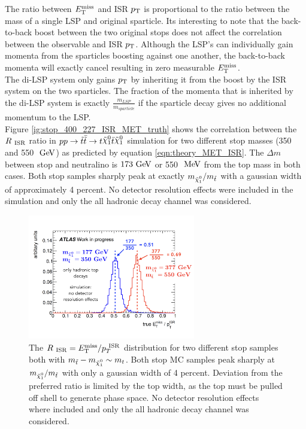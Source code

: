 \indent The ratio between $E_{\mathrm{T}}^{\mathrm{miss}}$ and ISR $p_{\mathrm{T}}$ is proportional to the ratio between the mass of a single LSP and original sparticle.  Its interesting to note that the back-to-back boost between the two original stops does not affect the correlation between the observable \MET and ISR $p_{\mathrm{T}}$.  Although the LSP's can individually gain momenta from the sparticles boosting against one another, the back-to-back momenta will exactly cancel resulting in zero measurable $E_{\mathrm{T}}^{\mathrm{miss}}$.  \\

\indent The di-LSP system only gains $p_{\mathrm{T}}$ by inheriting it from the boost by the ISR system on the two sparticles.  The fraction of the momenta that is inherited by the di-LSP system is exactly $\frac{m_{LSP}}{m_{sparticle}}$ if the sparticle decay gives no additional momentum to the LSP.  \\

\indent Figure \ref{ig:stop_400_227_ISR_MET_truth} shows the correlation between the $R_{~\mathrm{ISR}}$ ratio in $p p \rightarrow \antibar{\stop} \rightarrow t\ninoone\tbar\ninoone$ simulation for two different stop masses (350 and 550 $\gev$) as predicted by equation \ref{eqn:theory_MET_ISR}.  The $\Delta m$ between stop and neutralino is $173 \gev$ or 550 $\mev$ from the top mass in both cases.  Both stop samples sharply peak at exactly $m_{\ninoone}/m_{\stop}$ with a gaussian width of approximately 4 percent.  No detector resolution effects were included in the simulation and only the all hadronic decay channel was considered. \\

\begin{figure}[h!]
  \centering
	\includegraphics[width=0.65\textwidth]{./figures/strategy/RISR_truth.png}
\caption[$\RISR = \met/\PTISR$ distributions for stop signals with $m_{\stop} - m_{\ninoone} \sim m_t$ in MC simulation]{The $\RISR = \met/\PTISR $ distribution for two different stop samples both with $m_{\stop} - m_{\ninoone} \sim m_t$.  Both stop MC samples peak sharply at $m_{\ninoone}/m_{\stop}$ with only a gaussian width of 4 percent.  Deviation from the preferred ratio is limited by the top width, as the top must be pulled off shell to generate phase space. No detector resolution effects where included and only the all hadronic decay channel was considered.}
\label{fig:stop_400_227_ISR_MET_truth}
\end{figure}

